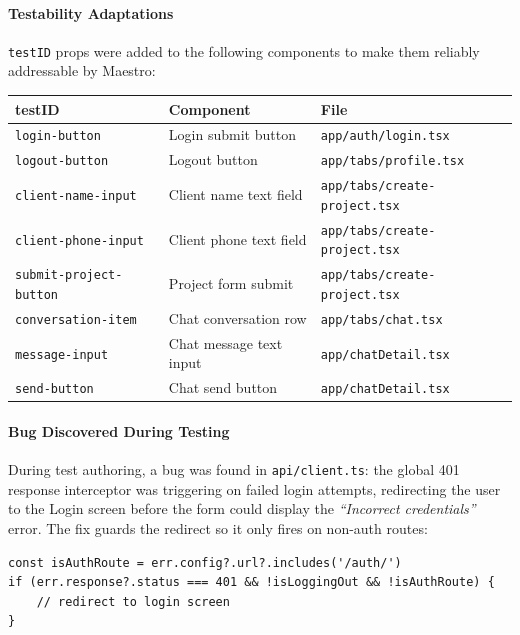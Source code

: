 \documentclass[12pt,a4paper]{article}
\begin{document}
\paragraph{Testability Adaptations}

\texttt{testID} props were added to the following components to make them reliably addressable by Maestro:

\begin{tabular}{lll}
\toprule
\textbf{testID} & \textbf{Component} & \textbf{File} \\
\midrule
\texttt{login-button}          & Login submit button     & \texttt{app/auth/login.tsx} \\
\texttt{logout-button}         & Logout button           & \texttt{app/tabs/profile.tsx} \\
\texttt{client-name-input}     & Client name text field  & \texttt{app/tabs/create-project.tsx} \\
\texttt{client-phone-input}    & Client phone text field & \texttt{app/tabs/create-project.tsx} \\
\texttt{submit-project-button} & Project form submit     & \texttt{app/tabs/create-project.tsx} \\
\texttt{conversation-item}     & Chat conversation row   & \texttt{app/tabs/chat.tsx} \\
\texttt{message-input}         & Chat message text input & \texttt{app/chatDetail.tsx} \\
\texttt{send-button}           & Chat send button        & \texttt{app/chatDetail.tsx} \\
\bottomrule
\end{tabular}

\paragraph{Bug Discovered During Testing}

During test authoring, a bug was found in \texttt{api/client.ts}: the global 401 response interceptor was triggering on failed login attempts, redirecting the user to the Login screen before the form could display the \textit{``Incorrect credentials''} error. The fix guards the redirect so it only fires on non-auth routes:

\begin{verbatim}
const isAuthRoute = err.config?.url?.includes('/auth/')
if (err.response?.status === 401 && !isLoggingOut && !isAuthRoute) {
    // redirect to login screen
}
\end{verbatim}
\end{document}

